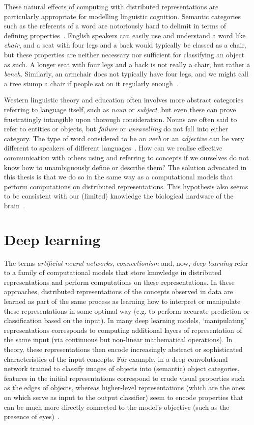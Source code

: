 These natural effects of computing with distributed representations are particularly appropriate for modelling linguistic cognition. Semantic categories such as the referents of a word are notoriously hard to delimit in terms of defining properties~\citep{fauconnier1994mental}. English speakers can easily use and understand a word like \emph{chair}, and a seat with four legs and a back would typically be classed as a chair, but these properties are neither necessary nor sufficient for classifying an object as such. A longer seat with four legs and a back is not really a chair, but rather a \emph{bench}. Similarly, an armchair does not typically have four legs, and we might call a tree stump a chair if people sat on it regularly enough~\citep{prinz2004furnishing}. 

Western linguistic theory and education often involves more abstract categories referring to language itself, such as \emph{noun} or \emph{subject}, but even these can prove frustratingly intangible upon thorough consideration. Nouns are often said to refer to entities or objects, but \emph{failure} or \emph{unravelling} do not fall into either category. The type of word considered to be an \emph{verb} or an \emph{adjective} can be very different to speakers of different languages~\citep{anward1997parts}. How can we realise effective communication with others using and referring to concepts if we ourselves do not know how to unambiguously define or describe them? The solution advocated in this thesis is that we do so in the same way as a computational models that perform computations on distributed representations. This hypothesis also seems to be consistent with our (limited) knowledge the biological hardware of the brain~\citep{kiefer2012conceptual}.
 
\section{Deep learning} The terms \emph{artificial neural networks}, \emph{connectionism} and, now, \emph{deep learning} refer to a family of computational models that store knowledge in distributed representations and perform computations on these representations. In these approaches, distributed representations of the concepts observed in data are learned as part of the same process as learning how to interpret or manipulate these representations in some optimal way (e.g. to perform accurate prediction or classification based on the input). In many deep learning models, `manipulating' representations corresponds to computing additional layers of representation of the same input (via continuous but non-linear mathematical operations). In theory, these representations then encode increasingly abstract or sophisticated characteristics of the input concepts. For example, in a deep convolutional network trained to classify images of objects into (semantic) object categories, features in the initial representations correspond to crude visual properties such as the edges of objects, whereas higher-level representations (which are the ones on which serve as input to the output classifier) seem to encode properties that can be much more directly connected to the model's objective (such as the presence of eyes)~\citep{zeiler2014visualizing}. 


